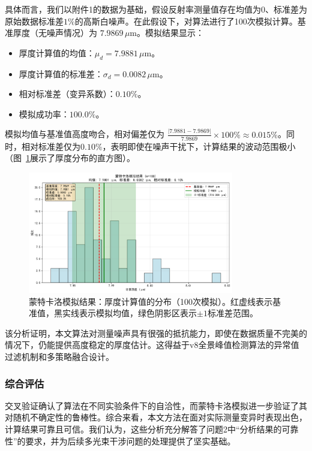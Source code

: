 \documentclass{ctexart} %
\begin{document}
具体而言，我们以附件1的数据为基础，假设反射率测量值存在均值为0、标准差为原始数据标准差$1\%$的高斯白噪声。在此假设下，对算法进行了100次模拟计算。基准厚度（无噪声情况）为 ${7.9869} \, \mu\text{m}$。模拟结果显示：
\begin{itemize}
    \item 厚度计算值的均值：$\mu_d =  7.9881 \, \mu\text{m}$。
    \item 厚度计算值的标准差：$\sigma_d = {0.0082} \, \mu\text{m}$。
    \item 相对标准差（变异系数）：${0.10}\%$。
    \item 模拟成功率：${100.0}\%$。
\end{itemize}
模拟均值与基准值高度吻合，相对偏差仅为 $\frac{|{7.9881} - {7.9869}|}{{7.9869}} \times 100\% \approx {0.015}\%$。同时，相对标准差仅为$0.10\%$，表明即使在噪声干扰下，计算结果的波动范围极小（图~\ref{fig:monte_carlo}展示了厚度分布的直方图）。

\begin{figure}[htbp]
    \centering
    \includegraphics[width=0.8\textwidth]{monte_carlo_result.png}
    \caption{蒙特卡洛模拟结果：厚度计算值的分布（100次模拟）。红虚线表示基准值，黑实线表示模拟均值，绿色阴影区表示$\pm 1$标准差范围。}
    \label{fig:monte_carlo}
\end{figure}

该分析证明，本文算法对测量噪声具有很强的抵抗能力，即使在数据质量不完美的情况下，仍能提供高度稳定的厚度估计。这得益于v8全景峰值检测算法的异常值过滤机制和多策略融合设计。

\subsubsection{综合评估}
交叉验证确认了算法在不同实验条件下的自洽性，而蒙特卡洛模拟进一步验证了其对随机不确定性的鲁棒性。综合来看，本文方法在面对实际测量变异时表现出色，计算结果可靠且可信。我们认为，这些分析充分解答了问题2中“分析结果的可靠性”的要求，并为后续多光束干涉问题的处理提供了坚实基础。
\end{document}
